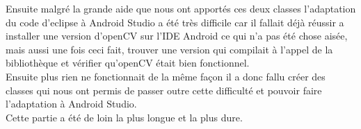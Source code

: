 \documentclass{article}
\begin{document}
Ensuite malgré la grande aide que nous ont apportés ces deux classes l'adaptation du code d'eclipse à Android Studio a été très difficile car il fallait déjà réussir a installer une version d'openCV sur l'IDE Android ce qui n'a pas été chose aisée, mais aussi une fois ceci fait, trouver une version qui compilait à l'appel de la bibliothèque et vérifier qu'openCV était bien fonctionnel.\\
Ensuite plus rien ne fonctionnait de la même façon il a donc fallu créer des classes qui nous ont permis de passer outre cette difficulté et pouvoir faire l'adaptation à Android Studio.\\

Cette partie a été de loin la plus longue et la plus dure.
\end{document}
